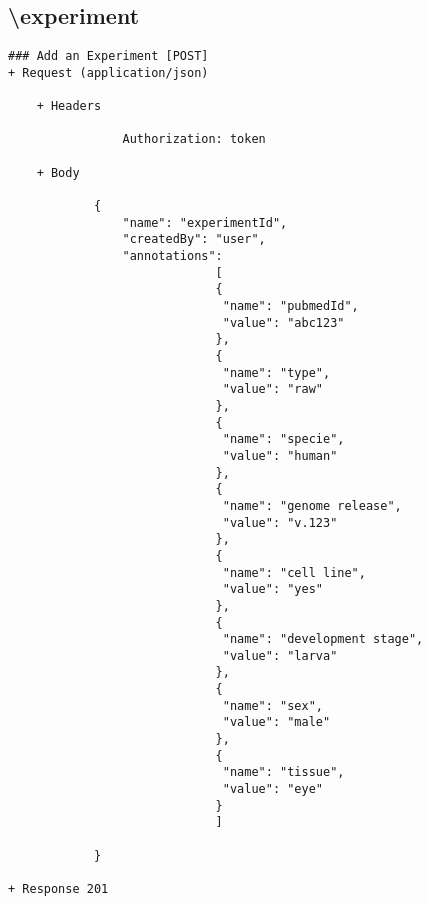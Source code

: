 \subsection*{\textbackslash experiment} 
\begin{verbatim}
### Add an Experiment [POST]
+ Request (application/json)

    + Headers
    
                Authorization: token
                
    + Body 
    
            {
                "name": "experimentId",
                "createdBy": "user",
                "annotations": 
                             [
                             {
                              "name": "pubmedId",
                              "value": "abc123"
                             }, 
                             {
                              "name": "type",
                              "value": "raw"
                             },
                             {
                              "name": "specie",
                              "value": "human"
                             },
                             {
                              "name": "genome release",
                              "value": "v.123"
                             },
                             {
                              "name": "cell line",
                              "value": "yes"
                             },
                             {
                              "name": "development stage",
                              "value": "larva"
                             },
                             {
                              "name": "sex",
                              "value": "male"
                             },
                             {
                              "name": "tissue",
                              "value": "eye"
                             }
                             ]
                
            }
        
+ Response 201
\end{verbatim}

